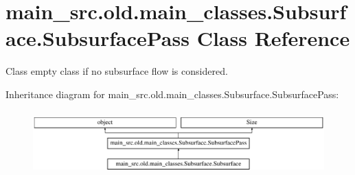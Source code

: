 \hypertarget{classmain__src_8old_1_1main__classes_1_1Subsurface_1_1SubsurfacePass}{\section{main\-\_\-src.\-old.\-main\-\_\-classes.\-Subsurface.\-Subsurface\-Pass Class Reference}
\label{classmain__src_8old_1_1main__classes_1_1Subsurface_1_1SubsurfacePass}
}


Class empty class if no subsurface flow is considered.  


Inheritance diagram for main\-\_\-src.\-old.\-main\-\_\-classes.\-Subsurface.\-Subsurface\-Pass\-:\begin{figure}[H]
\begin{center}
\leavevmode
\includegraphics[height=2.500000cm]{classmain__src_8old_1_1main__classes_1_1Subsurface_1_1SubsurfacePass}
\end{center}
\end{figure}
